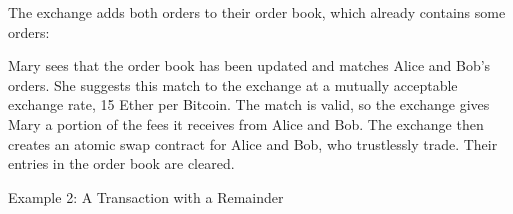 \documentclass[a4paper]{article}
\begin{document}
        The exchange adds both orders to their order book, which
        already contains some orders:
        \begin{center}
        \end{center}

        Mary sees that the order book has been updated and matches
        Alice and Bob's orders. She suggests this match to the
        exchange at a mutually acceptable exchange rate, 15 Ether
        per Bitcoin.
        The match is valid,
        so the exchange gives Mary
        a portion of the fees it receives from Alice and Bob. The exchange then creates an atomic swap contract
        for Alice and Bob, who
        trustlessly trade. Their entries in the order book are
        cleared.

        {Example 2: A Transaction with a Remainder}
\end{document}
